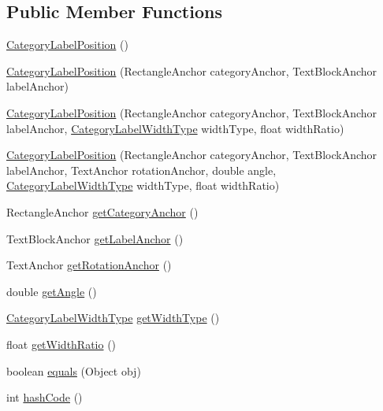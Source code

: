 \subsection*{Public Member Functions}
\begin{DoxyCompactItemize}
\item 
\mbox{\hyperlink{classorg_1_1jfree_1_1chart_1_1axis_1_1_category_label_position_a7a316ab4de4195fbd562351bc6456793}{Category\+Label\+Position}} ()
\item 
\mbox{\hyperlink{classorg_1_1jfree_1_1chart_1_1axis_1_1_category_label_position_aa9a65e0cf48d9997032998d01735a7a0}{Category\+Label\+Position}} (Rectangle\+Anchor category\+Anchor, Text\+Block\+Anchor label\+Anchor)
\item 
\mbox{\hyperlink{classorg_1_1jfree_1_1chart_1_1axis_1_1_category_label_position_a2dd27618bd10e32f8e4f856a049239ef}{Category\+Label\+Position}} (Rectangle\+Anchor category\+Anchor, Text\+Block\+Anchor label\+Anchor, \mbox{\hyperlink{classorg_1_1jfree_1_1chart_1_1axis_1_1_category_label_width_type}{Category\+Label\+Width\+Type}} width\+Type, float width\+Ratio)
\item 
\mbox{\hyperlink{classorg_1_1jfree_1_1chart_1_1axis_1_1_category_label_position_a7865926328d37fffb326557aa179b657}{Category\+Label\+Position}} (Rectangle\+Anchor category\+Anchor, Text\+Block\+Anchor label\+Anchor, Text\+Anchor rotation\+Anchor, double angle, \mbox{\hyperlink{classorg_1_1jfree_1_1chart_1_1axis_1_1_category_label_width_type}{Category\+Label\+Width\+Type}} width\+Type, float width\+Ratio)
\item 
Rectangle\+Anchor \mbox{\hyperlink{classorg_1_1jfree_1_1chart_1_1axis_1_1_category_label_position_a9f38c8806269327cf54ed7d2a8587a4f}{get\+Category\+Anchor}} ()
\item 
Text\+Block\+Anchor \mbox{\hyperlink{classorg_1_1jfree_1_1chart_1_1axis_1_1_category_label_position_a32213b7490c4c6f5e5b855cf04484306}{get\+Label\+Anchor}} ()
\item 
Text\+Anchor \mbox{\hyperlink{classorg_1_1jfree_1_1chart_1_1axis_1_1_category_label_position_ac5cba938d38c35a4eb7a7c108137b464}{get\+Rotation\+Anchor}} ()
\item 
double \mbox{\hyperlink{classorg_1_1jfree_1_1chart_1_1axis_1_1_category_label_position_a2d57ad1131cf3316640fc4dfd3adcac3}{get\+Angle}} ()
\item 
\mbox{\hyperlink{classorg_1_1jfree_1_1chart_1_1axis_1_1_category_label_width_type}{Category\+Label\+Width\+Type}} \mbox{\hyperlink{classorg_1_1jfree_1_1chart_1_1axis_1_1_category_label_position_a31cf9817388c3114d963f163f0d91f7c}{get\+Width\+Type}} ()
\item 
float \mbox{\hyperlink{classorg_1_1jfree_1_1chart_1_1axis_1_1_category_label_position_ac0ca1c9dd94139cf158b57b83838176a}{get\+Width\+Ratio}} ()
\item 
boolean \mbox{\hyperlink{classorg_1_1jfree_1_1chart_1_1axis_1_1_category_label_position_aba39b695b70e733e0469c900df981c9a}{equals}} (Object obj)
\item 
int \mbox{\hyperlink{classorg_1_1jfree_1_1chart_1_1axis_1_1_category_label_position_a9d75b4334667714e54d71313fdfad61c}{hash\+Code}} ()
\end{DoxyCompactItemize}


